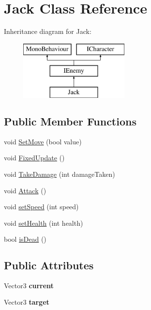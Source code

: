 \hypertarget{class_jack}{}\section{Jack Class Reference}
\label{class_jack}
Inheritance diagram for Jack\+:\begin{figure}[H]
\begin{center}
\leavevmode
\includegraphics[height=3.000000cm]{class_jack}
\end{center}
\end{figure}
\subsection*{Public Member Functions}
\begin{DoxyCompactItemize}
\item 
void \mbox{\hyperlink{class_jack_a5c422cd6a8147746decbfe4b9843f469}{Set\+Move}} (bool value)
\item 
void \mbox{\hyperlink{class_jack_aba39628731cb774d63414f8b0702794b}{Fixed\+Update}} ()
\item 
void \mbox{\hyperlink{class_jack_af6f345fe0fa0b4d3633b671d31d0d76e}{Take\+Damage}} (int damage\+Taken)
\item 
void \mbox{\hyperlink{class_jack_a5c58f59b2bd9197a006a3e4739cc4503}{Attack}} ()
\item 
void \mbox{\hyperlink{class_jack_a9ae28ec3e59646a7f5cdd7a2fcf58a20}{set\+Speed}} (int speed)
\item 
void \mbox{\hyperlink{class_jack_a8d41ae6c0691bcc01910758e106e29cf}{set\+Health}} (int health)
\item 
bool \mbox{\hyperlink{class_jack_a50b5fbbb94e899db67599a763f9e687b}{is\+Dead}} ()
\end{DoxyCompactItemize}
\subsection*{Public Attributes}
\begin{DoxyCompactItemize}
\item 
\mbox{\label{class_jack_ae497d5554be7cf372f934a2b024a4cfd}} 
Vector3 {\bfseries current}
\item 
\mbox{\label{class_jack_af0433564aed144c46d99ecc20518b501}} 
Vector3 {\bfseries target}
\end{DoxyCompactItemize}


